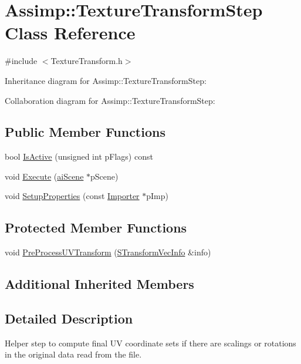\hypertarget{class_assimp_1_1_texture_transform_step}{\section{Assimp\+:\+:Texture\+Transform\+Step Class Reference}
\label{class_assimp_1_1_texture_transform_step}
}


{\ttfamily \#include $<$Texture\+Transform.\+h$>$}



Inheritance diagram for Assimp\+:\+:Texture\+Transform\+Step\+:


Collaboration diagram for Assimp\+:\+:Texture\+Transform\+Step\+:
\subsection*{Public Member Functions}
\begin{DoxyCompactItemize}
\item 
bool \hyperlink{class_assimp_1_1_texture_transform_step_a655b2e766c47bc94689616869318a1e0}{Is\+Active} (unsigned int p\+Flags) const 
\item 
void \hyperlink{class_assimp_1_1_texture_transform_step_aa169fc22d75109790ce62538bd1c902c}{Execute} (\hyperlink{structai_scene}{ai\+Scene} $\ast$p\+Scene)
\item 
void \hyperlink{class_assimp_1_1_texture_transform_step_a98b34f7e62e91f1d7b2e397b1222758c}{Setup\+Properties} (const \hyperlink{class_assimp_1_1_importer}{Importer} $\ast$p\+Imp)
\end{DoxyCompactItemize}
\subsection*{Protected Member Functions}
\begin{DoxyCompactItemize}
\item 
void \hyperlink{class_assimp_1_1_texture_transform_step_a1cc7926f68517dcffeaca9c53896180f}{Pre\+Process\+U\+V\+Transform} (\hyperlink{struct_assimp_1_1_s_transform_vec_info}{S\+Transform\+Vec\+Info} \&info)
\end{DoxyCompactItemize}
\subsection*{Additional Inherited Members}


\subsection{Detailed Description}
Helper step to compute final U\+V coordinate sets if there are scalings or rotations in the original data read from the file. 

